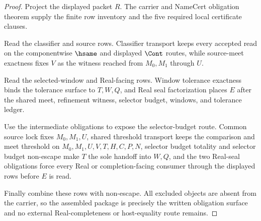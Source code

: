 \begin{proof}
Project the displayed packet $R$. The carrier and NameCert obligation theorem supply the finite row inventory and the five required local certificate clauses.

Read the classifier and source rows. Classifier transport keeps every accepted read on the componentwise $\hsame$ and displayed $\Cont$ routes, while source-meet exactness fixes $V$ as the witness reached from $M_0,M_1$ through $U$.

Read the selected-window and Real-facing rows. Window tolerance exactness binds the tolerance surface to $T,W,Q$, and Real seal factorization places $E$ after the shared meet, refinement witness, selector budget, windows, and tolerance ledger.

Use the intermediate obligations to expose the selector-budget route. Common source lock fixes $M_0,M_1,U$, shared threshold transport keeps the comparison and meet threshold on $M_0,M_1,U,V,T,H,C,P,N$, selector budget totality and selector budget non-escape make $T$ the sole handoff into $W,Q$, and the two Real-seal obligations force every Real or completion-facing consumer through the displayed rows before $E$ is read.

Finally combine these rows with non-escape. All excluded objects are absent from the carrier, so the assembled package is precisely the written obligation surface and no external Real-completeness or host-equality route remains.
\end{proof}

